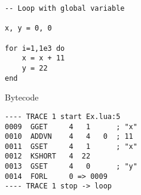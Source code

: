\begin{comment}
y = 0 

for i=1,1e3 do
	y = 11
end
\end{lstlisting}
\end{mdframed}

\noindent
Bytecode

\begin{lstlisting}[style=DumpStyle]
---- TRACE 1 start variables_global.lua:5
0007  KSHORT   4  11
0008  GSET     4   0      ; "y"
0009  FORL     0 => 0007
---- TRACE 1 stop -> loop
\end{lstlisting}


\noindent
IR

\begin{multicols}{2}
\begin{lstlisting}[style=DumpStyle]
---- TRACE 1 start Ex.lua:5
---- TRACE 1 IR
0001 rbp      int SLOAD  #1    CI
0002 rdx      fun SLOAD  #0    R
0003 rax      tab FLOAD  0002  func.env
0004          int FLOAD  0003  tab.hmask
0005       >  int EQ     0004  +63 
0006 rcx      p32 FLOAD  0003  tab.node
0007       >  p32 HREFK  0006  "y"  @34
0008          tab FLOAD  0003  tab.meta
0009       >  tab EQ     0008  NULL
0010          num HSTORE 0007  +11 
0011          nil TBAR   0003
0012 rbp    + int ADD    0001  +1  
0013       >  int LE     0012  +1000
0014 ------------ LOOP ------------
0015 rbp    + int ADD    0012  +1  
0016       >  int LE     0015  +1000
0017 rbp      int PHI    0012  0015
---- TRACE 1 stop -> loop
\end{lstlisting}
\end{multicols}

\end{comment} %


\begin{mdframed}[style=LuaStyleFrame]
\begin{lstlisting}[style=LuaStyle]
-- Loop with global variable

x, y = 0, 0

for i=1,1e3 do
	x = x + 11
	y = 22
end
\end{lstlisting}
\end{mdframed}

\noindent
Bytecode

\begin{multicols}{2}
\begin{lstlisting}[style=DumpStyle]
---- TRACE 1 start Ex.lua:5
0009  GGET     4   1      ; "x"
0010  ADDVN    4   4   0  ; 11
0011  GSET     4   1      ; "x"
0012  KSHORT   4  22
0013  GSET     4   0      ; "y"
0014  FORL     0 => 0009
---- TRACE 1 stop -> loop
\end{lstlisting}
\end{multicols}

